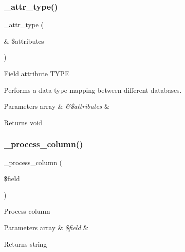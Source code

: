 \subsubsection{\texorpdfstring{\+\_\+attr\+\_\+type()}{\_attr\_type()}}
{\footnotesize\ttfamily \+\_\+attr\+\_\+type (\begin{DoxyParamCaption}\item[{\&}]{\$attributes }\end{DoxyParamCaption})\hspace{0.3cm}{\ttfamily [protected]}}

Field attribute T\+Y\+PE

Performs a data type mapping between different databases.


\begin{DoxyParams}[1]{Parameters}
array & {\em \&\$attributes} & \\
\hline
\end{DoxyParams}
\begin{DoxyReturn}{Returns}
void 
\end{DoxyReturn}
\mbox{\label{class_c_i___d_b__cubrid__forge_a8f38f1c5b5dddecca4befbe393f3f299}} 
\subsubsection{\texorpdfstring{\+\_\+process\+\_\+column()}{\_process\_column()}}
{\footnotesize\ttfamily \+\_\+process\+\_\+column (\begin{DoxyParamCaption}\item[{}]{\$field }\end{DoxyParamCaption})\hspace{0.3cm}{\ttfamily [protected]}}

Process column


\begin{DoxyParams}[1]{Parameters}
array & {\em \$field} & \\
\hline
\end{DoxyParams}
\begin{DoxyReturn}{Returns}
string 
\end{DoxyReturn}
\mbox{\label{class_c_i___d_b__cubrid__forge_ae0bdb4ea3418590d1894c5b621b5ca50}} 
